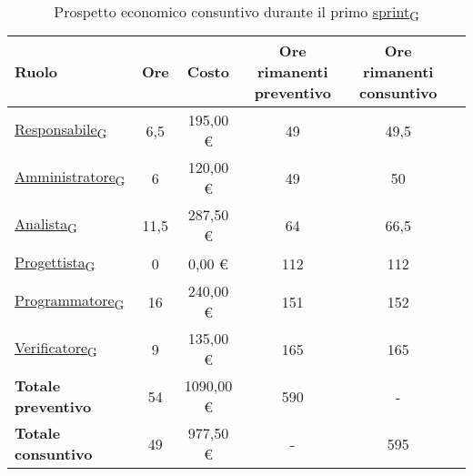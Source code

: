 \begin{table}[!h]
	\centering
	\begin{tabular}{ | l | c | c | c | c | c | }
		\hline
		\textbf{Ruolo}             & \textbf{Ore} & \textbf{Costo} & \textbf{Ore rimanenti preventivo} & \textbf{Ore rimanenti consuntivo} \\
		\hline
		\href{https://7last.github.io/docs/rtb/documentazione-interna/glossario\#responsabile}{Responsabile\textsubscript{G}}               & 6,5          & 195,00 €       & 49                                & 49,5                              \\
		\href{https://7last.github.io/docs/rtb/documentazione-interna/glossario\#amministratore}{Amministratore\textsubscript{G}}             & 6            & 120,00 €       & 49                                & 50                                \\
		\href{https://7last.github.io/docs/rtb/documentazione-interna/glossario\#analista}{Analista\textsubscript{G}}                   & 11,5         & 287,50 €       & 64                                & 66,5                              \\
		\href{https://7last.github.io/docs/rtb/documentazione-interna/glossario\#progettista}{Progettista\textsubscript{G}}                & 0            & 0,00 €         & 112                               & 112                               \\
		\href{https://7last.github.io/docs/rtb/documentazione-interna/glossario\#programmatore}{Programmatore\textsubscript{G}}              & 16           & 240,00 €       & 151                               & 152                               \\
		\href{https://7last.github.io/docs/rtb/documentazione-interna/glossario\#verificatore}{Verificatore\textsubscript{G}}               & 9            & 135,00 €       & 165                               & 165                               \\
		\hline
		\textbf{Totale preventivo} & 54           & 1090,00 €      & 590                               & -                                 \\
		\hline
		\textbf{Totale consuntivo} & 49           & 977,50 €       & -                                 & 595                               \\
		\hline
	\end{tabular}
	\caption{Prospetto economico consuntivo durante il primo \href{https://7last.github.io/docs/rtb/documentazione-interna/glossario\#sprint}{sprint\textsubscript{G}}}
	
\end{table}

